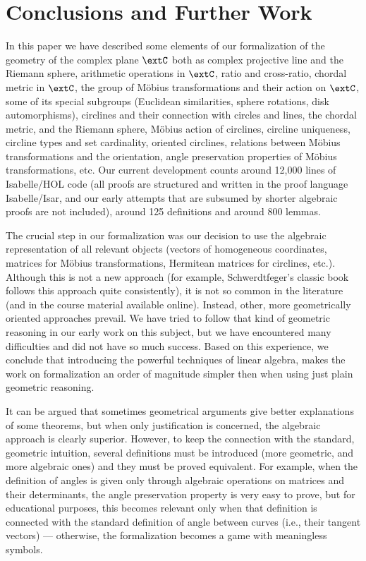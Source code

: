 

\section{Conclusions and Further Work}
\label{sec:concl}
In this paper we have described some elements of our formalization of
the geometry of the complex plane $\extC$ both as complex projective
line and the Riemann sphere, arithmetic operations in $\extC$, ratio
and cross-ratio, chordal metric in $\extC$, the group of M\"obius
transformations and their action on $\extC$, some of its special
subgroups (Euclidean similarities, sphere rotations, disk
automorphisms), circlines and their connection with circles and lines,
the chordal metric, and the Riemann sphere, M\"obius action of
circlines, circline uniqueness, circline types and set cardinality,
oriented circlines, relations between M\"obius transformations and the
orientation, angle preservation properties of M\"obius
transformations, etc. Our current development counts around 12,000
lines of Isabelle/HOL code (all proofs are structured and written in
the proof language Isabelle/Isar, and our early attempts that are
subsumed by shorter algebraic proofs are not included), around 125
definitions and around 800 lemmas.

The crucial step in our formalization was our decision to use the
algebraic representation of all relevant objects (vectors of
homogeneous coordinates, matrices for M\"obius transformations,
Hermitean matrices for circlines, etc.). Although this is not a new
approach (for example, Schwerdtfeger's classic book
\cite{schwerdtfeger} follows this approach quite consistently), it is
not so common in the literature (and in the course material available
online). Instead, other, more geometrically oriented approaches
prevail. We have tried to follow that kind of geometric reasoning in
our early work on this subject, but we have encountered many
difficulties and did not have so much success. Based on this
experience, we conclude that introducing the powerful techniques of
linear algebra, makes the work on formalization an order of magnitude
simpler then when using just plain geometric reasoning.

It can be argued that sometimes geometrical arguments give better
explanations of some theorems, but when only justification is
concerned, the algebraic approach is clearly superior. However, to
keep the connection with the standard, geometric intuition, several
definitions must be introduced (more geometric, and more algebraic
ones) and they must be proved equivalent. For example, when the
definition of angles is given only through algebraic operations on
matrices and their determinants, the angle preservation property is
very easy to prove, but for educational purposes, this becomes
relevant only when that definition is connected with the standard
definition of angle between curves (i.e., their tangent vectors) ---
otherwise, the formalization becomes a game with meaningless symbols.

